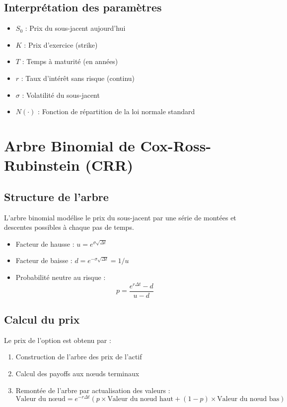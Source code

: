 \documentclass{article}
\begin{document}
\subsection{Interprétation des paramètres}

\begin{itemize}
    \item \( S_0 \) : Prix du sous-jacent aujourd'hui
    \item \( K \) : Prix d'exercice (strike)
    \item \( T \) : Temps à maturité (en années)
    \item \( r \) : Taux d'intérêt sans risque (continu)
    \item \( \sigma \) : Volatilité du sous-jacent
    \item \( N(\cdot) \) : Fonction de répartition de la loi normale standard
\end{itemize}

\section{Arbre Binomial de Cox-Ross-Rubinstein (CRR)}

\subsection{Structure de l'arbre}

L'arbre binomial modélise le prix du sous-jacent par une série de montées et descentes possibles à chaque pas de temps.

\begin{itemize}
    \item Facteur de hausse : \( u = e^{\sigma \sqrt{\Delta t}} \)
    \item Facteur de baisse : \( d = e^{-\sigma \sqrt{\Delta t}} = 1/u \)
    \item Probabilité neutre au risque : 
    \begin{equation}
    p = \frac{e^{r\Delta t} - d}{u - d}
    \end{equation}
\end{itemize}

\subsection{Calcul du prix}

Le prix de l'option est obtenu par :

\begin{enumerate}
    \item Construction de l'arbre des prix de l'actif
    \item Calcul des payoffs aux nœuds terminaux
    \item Remontée de l'arbre par actualisation des valeurs :
    \begin{equation}
    \text{Valeur du nœud} = e^{-r \Delta t} (p \times \text{Valeur du nœud haut} + (1-p) \times \text{Valeur du nœud bas})
    \end{equation}
\end{enumerate}
\end{document}
